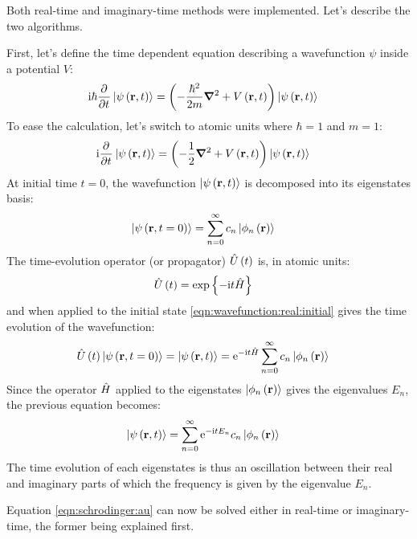 Both real-time and imaginary-time methods were implemented. Let's describe the
two algorithms.

First, let's define the time dependent \schrodinger equation describing a
wavefunction $\psi$ inside a potential $V$:
\begin{align}
\textrm{i} \hbar \frac{\partial^{{}}   }{\partial t^{{}}} \left| \psi\left( \textbf{r}, t \right) \right>
    & = \left( -\frac{\hbar^2}{2 m} \bm{\nabla}^2 + V\left( \textbf{r}, t \right)  \right) \left| \psi\left( \textbf{r},
t \right) \right>
\label{eqn:schrodinger:si}
\end{align}
To ease the calculation, let's switch to atomic units where $\hbar = 1$ and $m
= 1$:
\begin{align}
\textrm{i} \frac{\partial^{{}}   }{\partial t^{{}}} \left| \psi\left( \textbf{r}, t \right) \right>
    & = \left( -\frac{1}{2} \bm{\nabla}^2 + V\left( \textbf{r}, t \right)  \right) \left| \psi\left( \textbf{r}, t \right) \right>
\label{eqn:schrodinger:au}
\end{align}
At initial time $t = 0$, the wavefunction $\left| \psi\left( \textbf{r}, t \right) \right>$ is
decomposed into its eigenstates basis:
\begin{align}
\left| \psi\left( \textbf{r}, t=0 \right) \right> & = \sum_{n=0}^{\infty} c_n \left| \phi_n\left( \textbf{r} \right) \right>
\label{eqn:wavefunction:real:initial}
\end{align}
The time-evolution operator (or propagator) $\hat{U}\left( t \right)$ is, in atomic units:
\begin{align}
\hat{U}\left( t \right) & = \exp{ \left\{  - \textrm{i}t  \hat{H} \right\}}
\label{eqn:propagator:real}
\end{align}
and when applied to the initial state \eqref{eqn:wavefunction:real:initial}
gives the time evolution of the wavefunction:
\begin{align}
\hat{U}\left( t \right) \left| \psi\left( \textbf{r}, t=0 \right) \right>
    = \left| \psi\left( \textbf{r}, t \right) \right>
  & = \textrm{e}^{ - \textrm{i} t \hat{H} } \sum_{n=0}^{\infty} c_n \left| \phi_n\left( \textbf{r} \right) \right>
\end{align}
Since the operator $\hat{H}$ applied to the eigenstates
$\left| \phi_n\left( \textbf{r} \right) \right>$ gives the eigenvalues $E_n$, the previous equation
becomes:
\begin{align}
\left| \psi\left( \textbf{r}, t \right) \right>
 & = \sum_{n=0}^{\infty} \textrm{e}^{ - \textrm{i} t E_n } c_n \left| \phi_n\left( \textbf{r} \right) \right>
\label{eqn:wavefunction:eigenstates:time_evolution:real}
\end{align}
The time evolution of each eigenstates is thus an oscillation between their real
and imaginary parts of which the frequency is given by the eigenvalue $E_n$.



Equation \eqref{eqn:schrodinger:au} can now be solved either in real-time or
imaginary-time, the former being explained first.

